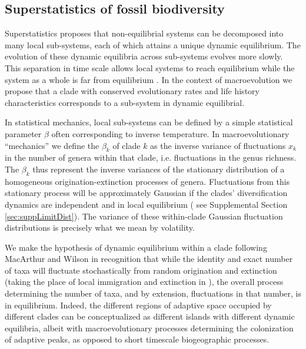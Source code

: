 \documentclass[12pt]{article}
\let\citep=\cite
\begin{document}
\subsection*{Superstatistics of fossil biodiversity}




Superstatistics \citep{beck2003} proposes that non-equilibrial systems
can be decomposed into many local sub-systems, each of which attains a
unique dynamic equilibrium. The evolution of these dynamic equilibria
across sub-systems evolves more slowly. This separation in time scale
allows local systems to reach equilibrium while the system as a whole
is far from equilibrium \citep{beck2003}.  In the context of
macroevolution we propose that a clade with conserved evolutionary
rates and life history characteristics corresponds to a sub-system in
dynamic equilibrial.

In statistical mechanics, local sub-systems can be defined by a simple
statistical parameter $\beta$ often corresponding to inverse
temperature. In macroevolutionary ``mechanics'' we define the
$\beta_k$ of clade $k$ as the inverse variance of fluctuations $x_k$
in the number of genera within that clade, i.e. fluctuations in the
genus richness.  The $\beta_k$ thus represent the inverse variances of
the stationary distribution of a homogeneous origination-extinction
processes of genera. Fluctuations from this stationary process will be
approximately Gaussian if the clades' diversification dynamics are
independent and in local equilibrium (\citep{keilson1970,
  grassmann1987} see Supplemental Section
\ref{sec:suppLimitDist}). The variance of these within-clade Gaussian
fluctuation distributions is precisely what we mean by volatility.

We make the hypothesis of dynamic equilibrium within a clade following
MacArthur and Wilson \citep{macWilson} in recognition that while the
identity and exact number of taxa will fluctuate stochastically from
random origination and extinction (taking the place of local
immigration and extinction in \citep{macWilson}), the overall process
determining the number of taxa, and by extension, fluctuations in that
number, is in equilibrium. Indeed, the different regions of adaptive
space occupied by different clades can be conceptualized as different
islands with different dynamic equilibria, albeit with
macroevolutionary processes determining the colonization of adaptive
peaks, as opposed to short timescale biogeographic processes.
\end{document}
